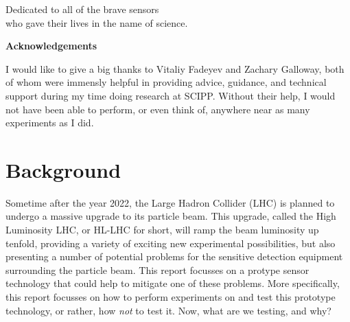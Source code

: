 \documentclass{report}
\begin{document}
    \newpage \vspace*{\fill}
        \begin{center} \begin{large}
            Dedicated to all of the brave sensors\\
            who gave their lives in the name of science.
        \end{large} \end{center}
    \vspace*{\fill} \newpage \vspace*{\fill}
        \begin{center} \begin{large}
            \large \textbf{Acknowledgements} \vspace{\baselineskip}

            I would like to give a big thanks to Vitaliy Fadeyev and Zachary Galloway, both of whom were immensly helpful in providing advice, guidance, and technical support during my time doing research at SCIPP. Without their help, I would not have been able to perform, or even think of, anywhere near as many experiments as I did.

        \end{large} \end{center}
    \vspace*{\fill} \newpage





     \setcounter{page}{1}
    \chapter{ Background }
        Sometime after the year 2022, the Large Hadron Collider (LHC) is planned to undergo a massive upgrade to its particle beam. This upgrade, called the High Luminosity LHC, or HL-LHC for short, will ramp the beam luminosity up tenfold, providing a variety of exciting new experimental possibilities, but also presenting a number of potential problems for the sensitive detection equipment surrounding the particle beam. This report focusses on a protype sensor technology that could help to mitigate one of these problems. More specifically, this report focusses on how to perform experiments on and test this prototype technology, or rather, how \textit{not} to test it. Now, what are we testing, and why?
            
\end{document}
